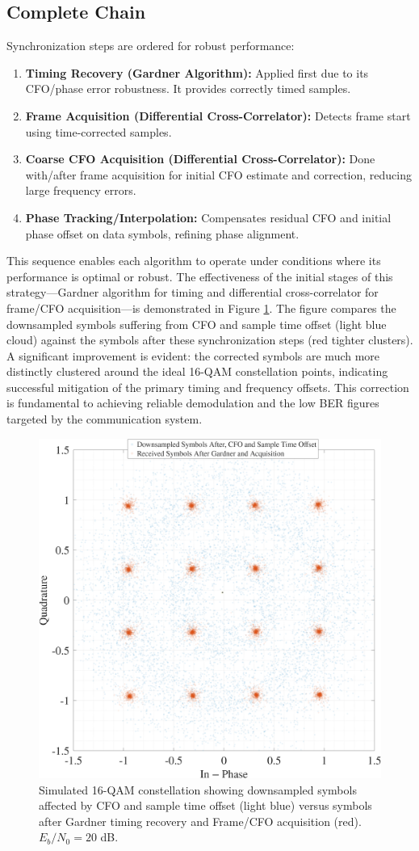 \documentclass[11pt]{article}
\begin{document}
	\subsection{Complete Chain}
	Synchronization steps are ordered for robust performance:
	\begin{enumerate}
		\item \textbf{Timing Recovery (Gardner Algorithm):} Applied first due to its CFO/phase error robustness. It provides correctly timed samples.
		\item \textbf{Frame Acquisition (Differential Cross-Correlator):} Detects frame start using time-corrected samples.
		\item \textbf{Coarse CFO Acquisition (Differential Cross-Correlator):} Done with/after frame acquisition for initial CFO estimate and correction, reducing large frequency errors.
		\item \textbf{Phase Tracking/Interpolation:} Compensates residual CFO and initial phase offset on data symbols, refining phase alignment.
	\end{enumerate}
	This sequence enables each algorithm to operate under conditions where its performance is optimal or robust. The effectiveness of the initial stages of this strategy—Gardner algorithm for timing and differential cross-correlator for frame/CFO acquisition—is demonstrated in Figure \ref{fig:const-corrected}. The figure compares the downsampled symbols suffering from CFO and sample time offset (light blue cloud) against the symbols after these synchronization steps (red tighter clusters). A significant improvement is evident: the corrected symbols are much more distinctly clustered around the ideal 16-QAM constellation points, indicating successful mitigation of the primary timing and frequency offsets. This correction is fundamental to achieving reliable demodulation and the low BER figures targeted by the communication system.
	
	\begin{figure}[H]
		\centering
		\includegraphics[width=0.7\linewidth]{Images/const-corrected.png} 
		\caption{Simulated 16-QAM constellation showing downsampled symbols affected by CFO and sample time offset (light blue) versus symbols after Gardner timing recovery and Frame/CFO acquisition (red). $E_b/N_0 = 20$ dB.}
		\label{fig:const-corrected}
	\end{figure}
	
\end{document}
